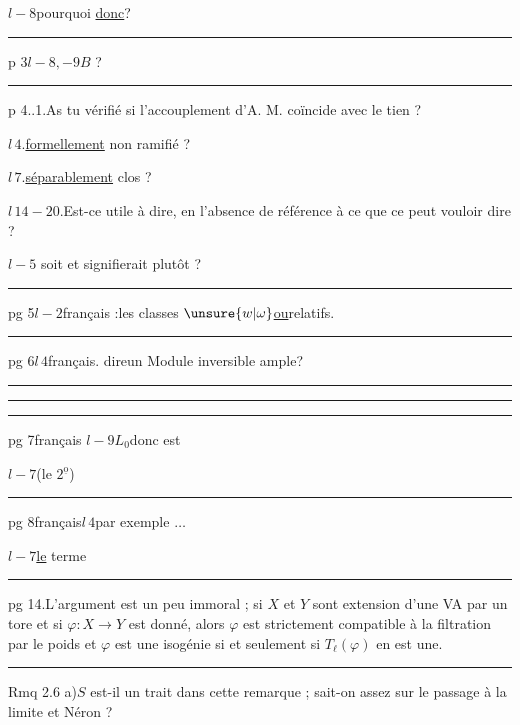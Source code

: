 
$l-8$\qquad pourquoi \uline{donc}\qquad ?

\hrule

p 3\quad $l-8,-9$\qquad $B$ ?

\hrule

p 4..1.\qquad As tu vérifié si l'accouplement d'A. M. coïncide avec le tien ?

$l\,4$.\qquad \uline{formellement} non ramifié ?

$l\,7$.\qquad \uline{séparablement} clos ?

$l\,14-20$.\quad Est-ce utile à dire, en l'absence de référence à ce que ce peut vouloir dire ?

$l-5$\qquad {} soit \qquad et \qquad signifierait \qquad plutôt ?

\hrule

pg 5\quad $l-2$\qquad français :\quad les classes $\unsure{w|\omega}$\qquad \uline{ou}\qquad relatifs.

\hrule

pg 6\quad $l\,4$\qquad français. dire\qquad un Module inversible ample\qquad ?


\hrule\smallskip\hrule\smallskip\hrule


pg 7\qquad français \uline{$l-9$}\quad {}$L_0$\quad donc  est

\quad $l-7$\quad {}\quad (le $2^{\underline{\mathrm o}}$)

\hrule

pg 8\qquad français\quad $l\,4$\qquad par exemple  $\ldots$

$l-7$\quad \uline{le} terme

\hrule

pg 14.\qquad L'argument est un peu immoral ; si $X$ et $Y$ sont extension d'une VA par un tore et si $\varphi:X\longrightarrow Y$ est donné, alors $\varphi$ est strictement compatible à la filtration par le poids et $\varphi$ est une isogénie si et seulement si $T_\ell(\varphi)$ en est une.

\hrule

\quad Rmq 2.6 a)\qquad $S$ est-il un trait dans cette remarque ; sait-on assez sur le passage à la limite et Néron ?
